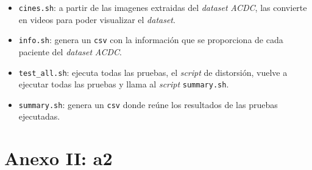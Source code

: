 \documentclass[12pt,a4paper]{article}
\begin{document}
\begin{itemize}
\begin{itemize}
\item \texttt{cines.sh}: a partir de las imagenes extraidas del \textit{dataset} \textit{ACDC}, las convierte en videos para poder visualizar el \textit{dataset}.

\item \texttt{info.sh}: genera un \texttt{csv} con la información que se proporciona de cada paciente del \textit{dataset} \textit{ACDC}.

\item \texttt{test\_all.sh}: ejecuta todas las pruebas, el \textit{script} de distorsión, vuelve a ejecutar todas las pruebas y llama al \textit{script} \texttt{summary.sh}.

\item \texttt{summary.sh}: genera un \texttt{csv} donde reúne los resultados de las pruebas ejecutadas.
\end{itemize}

\end{itemize}


\newpage
\section{Anexo II: a2}\label{anexo2}

\newpage
\nocite{*}
\renewcommand\refname{Bibliografía}



\clearpage


\printglossary[type=\acronymtype,style=long,title={Índice de acrónimos}]

\end{document}
